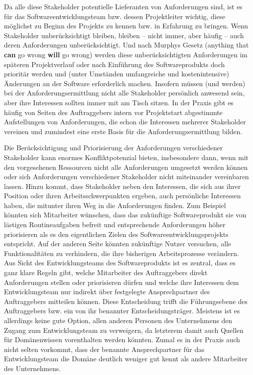 Da alle diese Stakeholder potentielle Lieferanten von Anforderungen sind, ist es für das Softwareentwicklungsteam bzw. dessen Projektleiter wichtig, diese möglichst zu Beginn des Projekts zu kennen bzw. in Erfahrung zu bringen. Wenn Stakeholder unberücksichtigt bleiben, bleiben -- nicht immer, aber häufig -- auch deren Anforderungen unberücksichtigt. Und nach Murphys Gesetz (anything that \textbf{can} go wrong \textbf{will} go wrong) werden diese unberücksichtigten Anforderungen im späteren Projekt\-verlauf oder nach Einführung des Softwareprodukts doch prioritär werden und (unter Umständen umfangreiche und kostenintensive) Änderungen an der Software erforderlich machen. Insofern müssen (und werden) bei der Anforderungsermittlung nicht alle Stakeholder persönlich anwesend sein, aber ihre Interessen sollten immer mit am Tisch sitzen. In der Praxis gibt es häufig von Seiten des Auftraggebers intern vor Projektstart abgestimmte Aufstellungen von Anforderungen, die schon die Interessen mehrerer Stakeholder vereinen und zumindest eine erste Basis für die Anforderungsermittlung bilden.

\vspace{1.5mm} %

Die  Berücksichtigung und Priorisierung der Anforderungen verschiedener Stake\-holder kann enormes Konfliktpotenzial bieten, insbesondere dann, wenn mit den vorgesehenen Ressourcen nicht alle Anforderungen umgesetzt werden können oder sich Anforderungen verschiedener Stakeholder nicht miteinander vereinbaren lassen. Hinzu kommt, dass Stakeholder neben den Interessen, die sich aus ihrer Position oder ihren Arbeitsschwerpunkten ergeben, auch persönliche Interessen haben, die mit\-unter ihren Weg in die Anforderungen finden. Zum Beispiel könnten sich Mitarbeiter wünschen, dass das zukünftige Softwareprodukt sie von lästigen Routineaufgaben befreit und entsprechende Anforderungen höher priorisieren als es den eigentlichen Zielen des Softwareentwicklungsprojekts entspricht. Auf der anderen Seite könnten zukünftige Nutzer versuchen, alle Funktionalitäten zu verhindern, die ihre bisherigen Arbeitsprozesse verändern. Aus Sicht des Entwicklungsteams des Softwareprodukts ist es zentral, dass es ganz klare Regeln gibt, welche Mitarbeiter des Auftraggebers direkt Anforderungen stellen oder priorisieren dürfen und welche ihre Interessen dem Entwicklungsteam nur indirekt über festgelegte Ansprechpartner des Auftraggebers mitteilen können. Diese Entscheidung trifft die Führungsebene des Auftraggebers bzw. ein von ihr benannter Entscheidungsträger. Meistens ist es allerdings keine gute Option, allen anderen Personen des Unternehmens den Zugang zum Entwicklungsteam zu verweigern, da letzterem damit auch Quellen für Domänenwissen vorenthalten werden könnten. Zumal es in der Praxis auch nicht selten vorkommt, dass der benannte Ansprechpartner für das Entwicklungsteam die Domäne deutlich weniger gut kennt als andere Mitarbeiter des Unternehmens.

